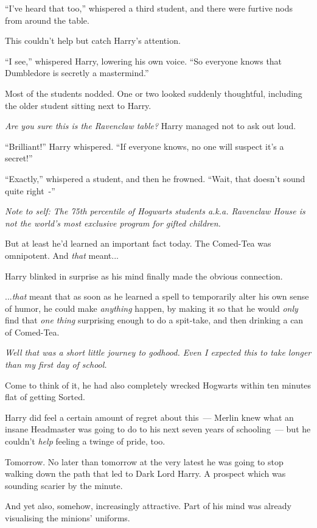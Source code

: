 ``I've heard that too,'' whispered a third student, and there were furtive nods from around the table.

This couldn't help but catch Harry's attention.

``I see,'' whispered Harry, lowering his own voice. ``So everyone knows that Dumbledore is secretly a mastermind.''

Most of the students nodded. One or two looked suddenly thoughtful, including the older student sitting next to Harry.

\emph{Are you sure this is the Ravenclaw table?} Harry managed not to ask out loud.

``Brilliant!'' Harry whispered. ``If everyone knows, no one will suspect it's a secret!''

``Exactly,'' whispered a student, and then he frowned. ``Wait, that doesn't sound quite right~-''

\emph{Note to self: The 75th percentile of Hogwarts students a.k.a. Ravenclaw House is not the world's most exclusive program for gifted children.}

But at least he'd learned an important fact today. The Comed-Tea was omnipotent. And \emph{that} meant...

Harry blinked in surprise as his mind finally made the obvious connection.

...\emph{that} meant that as soon as he learned a spell to temporarily alter his own sense of humor, he could make \emph{anything} happen, by making it so that he would \emph{only} find that \emph{one thing} surprising enough to do a spit-take, and then drinking a can of Comed-Tea.

\emph{Well that was a short little journey to godhood. Even I expected this to take longer than my first day of school.}

Come to think of it, he had also completely wrecked Hogwarts within ten minutes flat of getting Sorted.

Harry did feel a certain amount of regret about this~--- Merlin knew what an insane Headmaster was going to do to his next seven years of schooling~--- but he couldn't \emph{help} feeling a twinge of pride, too.

Tomorrow. No later than tomorrow at the very latest he was going to stop walking down the path that led to Dark Lord Harry. A prospect which was sounding scarier by the minute.

And yet also, somehow, increasingly attractive. Part of his mind was already visualising the minions' uniforms.

